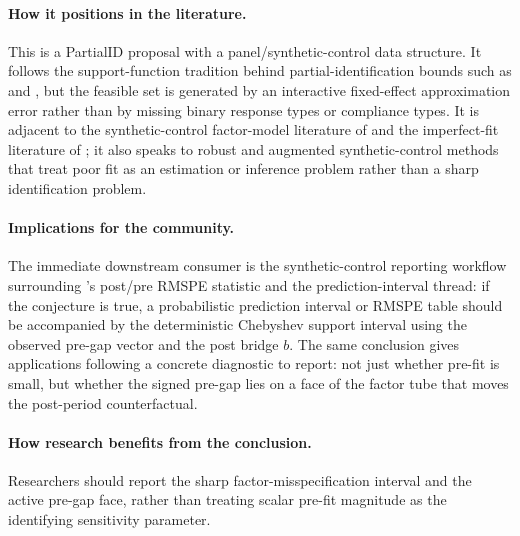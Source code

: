 \documentclass[11pt]{article}
\theoremstyle{definition}
\theoremstyle{plain}
\theoremstyle{remark}
\begin{document}
\paragraph{How it positions in the literature.}
This is a PartialID proposal with a panel/synthetic-control data structure. It follows the support-function tradition behind partial-identification bounds such as \citet{Manski1990} and \citet{BalkePearl1997}, but the feasible set is generated by an interactive fixed-effect approximation error rather than by missing binary response types or compliance types. It is adjacent to the synthetic-control factor-model literature of \citet{AbadieDiamondHainmueller2010} and the imperfect-fit literature of \citet{FermanPinto2021}; it also speaks to robust and augmented synthetic-control methods that treat poor fit as an estimation or inference problem rather than a sharp identification problem.

\paragraph{Implications for the community.}
The immediate downstream consumer is the synthetic-control reporting workflow surrounding \citet{Abadie2021}'s post/pre RMSPE statistic and the \citet{CattaneoFengTitiunik2021} prediction-interval thread: if the conjecture is true, a probabilistic prediction interval or RMSPE table should be accompanied by the deterministic Chebyshev support interval using the observed pre-gap vector and the post bridge \(b\). The same conclusion gives applications following \citet{Abadie2021} a concrete diagnostic to report: not just whether pre-fit is small, but whether the signed pre-gap lies on a face of the factor tube that moves the post-period counterfactual.

\paragraph{How research benefits from the conclusion.}
Researchers should report the sharp factor-misspecification interval and the active pre-gap face, rather than treating scalar pre-fit magnitude as the identifying sensitivity parameter.
\end{document}
